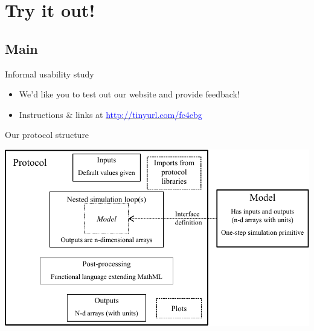 \documentclass[t,xcolor={usenames,dvipsnames}]{beamer}
\newcommand{\myhref}[2]{\href{#1}{\textcolor{Blue}{#2}}}
\newcommand{\myurl}[1]{\myhref{#1}{#1}}
\begin{document}
\section{Try it out!}
\subsection*{Main}

\begin{frame}{Informal usability study}
\begin{itemize}
\item We'd like you to test out our website and provide feedback!
\item Instructions \& links at \myurl{http://tinyurl.com/fc4cbg}
\end{itemize}
\end{frame}


\appendix

\begin{frame}{Our protocol structure}
\begin{center}
\includegraphics[width=\textwidth]{protocol_language}
\end{center}
\end{frame}
\end{document}
